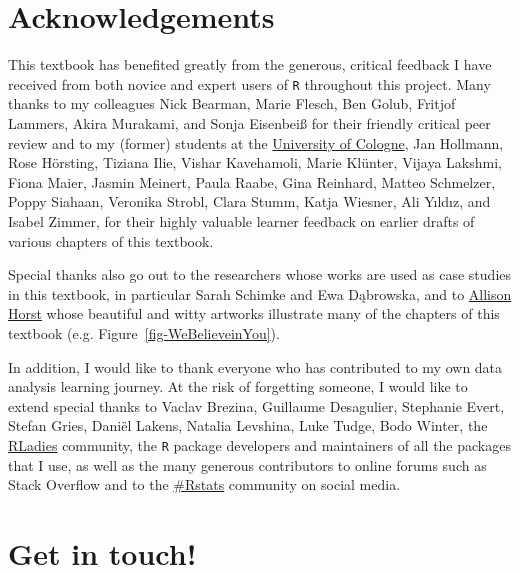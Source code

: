 \documentclass[
  letterpaper,
  DIV=11,
  numbers=noendperiod]{scrreprt}
\begin{document}
\section*{\texorpdfstring{Acknowledgements
}{Acknowledgements }}\label{acknowledgements}


This textbook has benefited greatly from the generous, critical feedback
I have received from both novice and expert users of \texttt{R}
throughout this project. Many thanks to my colleagues Nick Bearman,
Marie Flesch, Ben Golub, Fritjof Lammers, Akira Murakami, and Sonja
Eisenbeiß for their friendly critical peer review and to my (former)
students at the
\href{https://romanistik.phil-fak.uni-koeln.de/}{University of Cologne},
Jan Hollmann, Rose Hörsting, Tiziana Ilie, Vishar Kavehamoli, Marie
Klünter, Vijaya Lakshmi, Fiona Maier, Jasmin Meinert, Paula Raabe, Gina
Reinhard, Matteo Schmelzer, Poppy Siahaan, Veronika Strobl, Clara Stumm,
Katja Wiesner, Ali Yıldız, and Isabel Zimmer, for their highly valuable
learner feedback on earlier drafts of various chapters of this textbook.

Special thanks also go out to the researchers whose works are used as
case studies in this textbook, in particular Sarah Schimke and Ewa
Dąbrowska, and to \href{https://allisonhorst.com/}{Allison Horst} whose
beautiful and witty artworks illustrate many of the chapters of this
textbook (e.g. Figure~\ref{fig-WeBelieveinYou}).

In addition, I would like to thank everyone who has contributed to my
own data analysis learning journey. At the risk of forgetting someone, I
would like to extend special thanks to Vaclav Brezina, Guillaume
Desagulier, Stephanie Evert, Stefan Gries, Daniël Lakens, Natalia
Levshina, Luke Tudge, Bodo Winter, the
\href{https://rladies.org/}{RLadies} community, the \texttt{R} package
developers and maintainers of all the packages that I use, as well as
the many generous contributors to online forums such as Stack Overflow
and to the \href{https://fediscience.org/tags/rstats}{\#Rstats}
community on social media.

\section*{\texorpdfstring{Get in touch!
️}{Get in touch! ️}}\label{get-in-touch}
\end{document}
